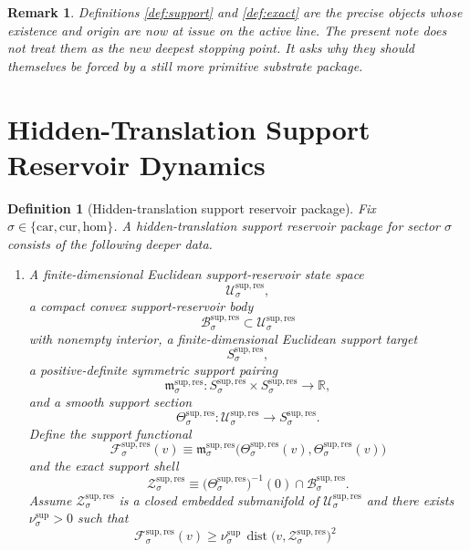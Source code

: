 \documentclass[11pt]{article}
\newcommand{\Car}{\mathrm{car}}
\newcommand{\Cur}{\mathrm{cur}}
\newcommand{\Hom}{\mathrm{hom}}
\newcommand{\ResSpace}[1]{\mathcal U_{#1}^{\mathrm{sup,res}}}
\newcommand{\ResBody}[1]{\mathcal B_{#1}^{\mathrm{sup,res}}}
\newcommand{\ResTarget}[1]{S_{#1}^{\mathrm{sup,res}}}
\newcommand{\ResPair}[1]{\mathfrak m_{#1}^{\mathrm{sup,res}}}
\newcommand{\ResSection}[1]{\Theta_{#1}^{\mathrm{sup,res}}}
\newcommand{\ResFunctional}[1]{\mathscr F_{#1}^{\mathrm{sup,res}}}
\newcommand{\ResShellSet}[1]{\mathcal Z_{#1}^{\mathrm{sup,res}}}
\newtheorem{definition}{Definition}
\newtheorem{remark}{Remark}
\begin{document}
\begin{remark}
Definitions \ref{def:support} and \ref{def:exact} are the precise objects whose existence and origin are now at issue on the active line. The present note does not treat them as the new deepest stopping point. It asks why they should themselves be forced by a still more primitive substrate package.
\end{remark}

\section{Hidden-Translation Support Reservoir Dynamics}

\begin{definition}[Hidden-translation support reservoir package]
\label{def:reservoir}
Fix \(\sigma\in\{\Car,\Cur,\Hom\}\). A \emph{hidden-translation support reservoir package} for sector \(\sigma\) consists of the following deeper data.
\begin{enumerate}
    \item A finite-dimensional Euclidean support-reservoir state space
    \[
    \ResSpace{\sigma},
    \]
    a compact convex support-reservoir body
    \[
    \ResBody{\sigma}\subset\ResSpace{\sigma}
    \]
    with nonempty interior, a finite-dimensional Euclidean support target
    \[
    \ResTarget{\sigma},
    \]
    a positive-definite symmetric support pairing
    \[
    \ResPair{\sigma}:\ResTarget{\sigma}\times\ResTarget{\sigma}\to\mathbb R,
    \]
    and a smooth support section
    \[
    \ResSection{\sigma}:\ResSpace{\sigma}\to\ResTarget{\sigma}.
    \]
    Define the support functional
    \begin{equation}
    \ResFunctional{\sigma}(v)
    \equiv
    \ResPair{\sigma}\bigl(\ResSection{\sigma}(v),\ResSection{\sigma}(v)\bigr)
    \label{eq:reservoirfunctional}
    \end{equation}
    and the exact support shell
    \begin{equation}
    \ResShellSet{\sigma}
    \equiv
    \bigl(\ResSection{\sigma}\bigr)^{-1}(0)\cap\ResBody{\sigma}.
    \label{eq:reservoirshell}
    \end{equation}
    Assume \(\ResShellSet{\sigma}\) is a closed embedded submanifold of \(\ResSpace{\sigma}\) and there exists \(\nu_{\sigma}^{\mathrm{sup}}>0\) such that
    \begin{equation}
    \ResFunctional{\sigma}(v)
    \ge
    \nu_{\sigma}^{\mathrm{sup}}\,
    \operatorname{dist}\bigl(v,\ResShellSet{\sigma}\bigr)^{2}
    \qquad

\end{equation}
\end{enumerate}
\end{definition}
\end{document}
